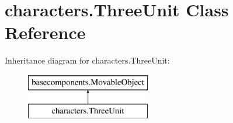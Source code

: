 \hypertarget{classcharacters_1_1_three_unit}{\section{characters.\-Three\-Unit Class Reference}
\label{classcharacters_1_1_three_unit}
}
Inheritance diagram for characters.\-Three\-Unit\-:\begin{figure}[H]
\begin{center}
\leavevmode
\includegraphics[height=2.000000cm]{classcharacters_1_1_three_unit}
\end{center}
\end{figure}
